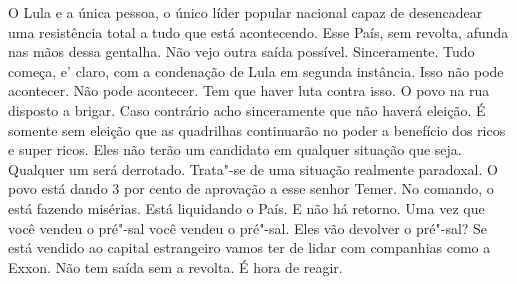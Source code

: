 \falaM O Lula e a única pessoa, o único líder popular nacional capaz de
desencadear uma resistência total a tudo que está acontecendo. Esse
País, sem revolta, afunda nas mãos dessa gentalha. Não vejo outra saída
possível. Sinceramente. Tudo começa, e' claro, com a condenação de Lula
em segunda instância. Isso não pode acontecer. Não pode acontecer. Tem
que haver luta contra isso. O povo na rua disposto a brigar. Caso
contrário acho sinceramente que não haverá eleição. É somente sem
eleição que as quadrilhas continuarão no poder a benefício dos ricos e
super ricos. Eles não terão um candidato em qualquer situação que seja.
Qualquer um será derrotado. Trata"-se de uma situação realmente
paradoxal. O povo está dando 3 por cento de aprovação a esse senhor
Temer. No comando, o está fazendo misérias. Está liquidando o País. E
não há retorno. Uma vez que você vendeu o pré"-sal você vendeu o pré"-sal.
Eles vão devolver o pré"-sal? Se está vendido ao capital estrangeiro
vamos ter de lidar com companhias como a Exxon. Não tem saída sem a
revolta. É hora de reagir.
